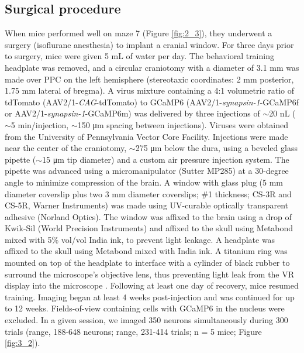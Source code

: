 \subsection{Surgical procedure} \label{methods:surgery}
When mice performed well on maze 7 (Figure \ref{fig:2_3}), they underwent a surgery (isoflurane anesthesia) to implant a cranial window. For three days prior to surgery, mice were given 5 mL of water per day. The behavioral training headplate was removed, and a circular craniotomy with a diameter of 3.1 mm was made over PPC on the left hemisphere (stereotaxic coordinates: 2 mm posterior, 1.75 mm lateral of bregma). A virus mixture containing a 4:1 volumetric ratio of tdTomato (AAV2/1-\textit{CAG}-tdTomato) to GCaMP6 (AAV2/1-\textit{synapsin-1}-GCaMP6f or AAV2/1-\textit{synapsin-1}-GCaMP6m) was delivered by three injections of $\sim$20 nL ($\sim$5 min/injection, $\sim$150 μm spacing between injections). Viruses were obtained from the University of Pennsylvania Vector Core Facility. Injections were made near the center of the craniotomy, $\sim$275 μm below the dura, using a beveled glass pipette ($\sim$15 μm tip diameter) and a custom air pressure injection system. The pipette was advanced using a micromanipulator (Sutter MP285) at a 30-degree angle to minimize compression of the brain. A window with glass plug (5 mm diameter coverslip plus two 3 mm diameter coverslips; \#1 thickness; CS-3R and CS-5R, Warner Instruments) was made using UV-curable optically transparent adhesive (Norland Optics). The window was affixed to the brain using a drop of Kwik-Sil (World Precision Instruments) and affixed to the skull using Metabond mixed with  5\% vol/vol India ink, to prevent light leakage. A headplate was affixed to the skull using Metabond mixed with India ink. A titanium ring was mounted on top of the headplate to interface with a cylinder of black rubber to surround the microscope’s objective lens, thus preventing light leak from the VR display into the microscope \citep{Dombeck:2010jr}. Following at least one day of recovery, mice resumed training. Imaging began at least 4 weeks post-injection and was continued for up to 12 weeks. Fields-of-view containing cells with GCaMP6 in the nucleus were excluded. In a given session, we imaged 350 neurons simultaneously during 300 trials (range, 188-648 neurons; range, 231-414 trials; n = 5 mice; Figure \ref{fig:3_2}).

